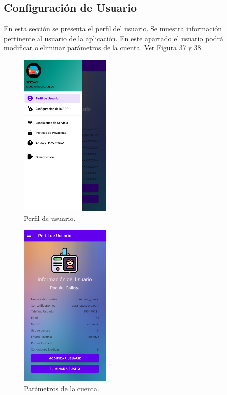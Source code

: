 \documentclass[a4paper,10pt, oneside, titlepage]{article}
\begin{document}
	\subsection{Configuración de Usuario}
	En esta sección se presenta el perfil del usuario. Se muestra información pertinente al usuario de la aplicación. En este apartado el usuario podrá modificar o eliminar parámetros de la cuenta. Ver Figura 37 y 38.
	\begin{figure}[!ht]
		\centering
		\includegraphics[width = 0.4\linewidth, height = 8.1cm]{37.png}
		\caption{Perfil de usuario.}
	\end{figure}
	\begin{figure}[!ht]
		\centering
		\includegraphics[width = 0.4\linewidth, height = 8.1cm]{38.png}
		\caption{Parámetros de la cuenta.}
	\end{figure}\\
\end{document}
